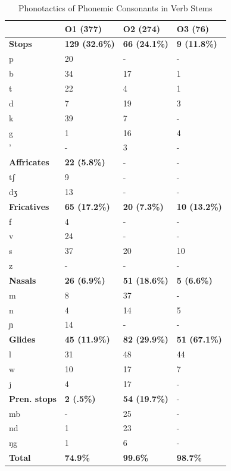 \begin{table} 
\centering
\begin{tabular}{l|lll}
 \midrule
 & O1 (377) & O2 (274) &  O3 (76)    \\  \midrule
{\bfseries Stops}  & {\bfseries 129 (32.6\%)} & {\bfseries 66 (24.1\%)}  & {\bfseries 9 (11.8\%)}   \\ 
        p & 20  & -  &  -   \\ 
         b  & 34   & 17 & 1    \\
          t  &  22   &  4  &  1 \\
        d   & 7   &  19  &  3  \\
         k  &  39   &  7   &  -  \\
          g &  1   & 16  & 4  \\
         '  &   -   & 3   & -   \\  \midrule
{\bfseries Affricates}  & {\bfseries 22 (5.8\%)}  & - & - \\ 
	tʃ &    9 &  -  & - \\
	dʒ &  13  &  -  & -    \\   \midrule
{\bfseries Fricatives}  & {\bfseries 65 (17.2\%)} & {\bfseries 20 (7.3\%)} & {\bfseries 10 (13.2\%)}  \\
           f & 4 &  -  &  - \\ 
           v &  24  &  -  & -  \\ 
          s  &  37    & 20   &  10 \\
         z  &  -  &  -  &  - \\  \midrule
{\bfseries Nasals}  & {\bfseries 26 (6.9\%)} & {\bfseries 51 (18.6\%)}  & {\bfseries  5 (6.6\%)}   \\
         m &  8  &  37   &  - \\ 
         n  &  4   &  14   & 5 \\
         ɲ  &  14  &  -  &  - \\  \midrule
{\bfseries Glides}  & {\bfseries 45 (11.9\%)} & {\bfseries 82 (29.9\%)}  & {\bfseries  51 (67.1\%)}  \\
           l &   31  & 48   &  44 \\
           w & 10   &   17  &  7 \\
           j  &  4  & 17  & -  \\  \midrule	
{\bfseries Pren. stops}  & {\bfseries 2 (.5\%)}   & {\bfseries 54  (19.7\%)} & -  \\
	mb   & - & 25 & -  \\
	nd    & 1 & 23 &  - \\
	ŋg 	& 1  & 6  & -  \\  \midrule
{\bfseries Total} & {\bfseries 74.9\%} & {\bfseries 99.6\%} & {\bfseries 98.7\%} \\  \midrule
\end{tabular}
\caption{Phonotactics of Phonemic Consonants in Verb Stems}
\label{Tab:PhonotactV}
\end{table}

